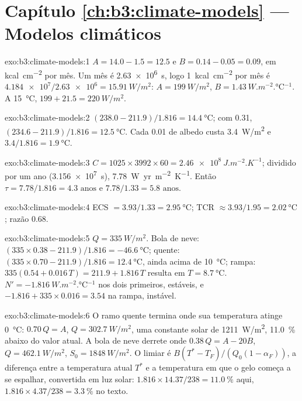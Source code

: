 \section*{Capítulo \ref{ch:b3:climate-models} --- Modelos climáticos}

\begin{solution}{exo:b3:climate-models:1}
$A = 14.0 - 1.5 = \num{12.5}$ e $B = 0.14 - 0.05 = \num{0.09}$, em
\unit{kcal.cm^{-2}} por mês. Um mês é \qty{2.63e6}{s}, logo
\qty{1}{kcal.cm^{-2}} por mês é $\num{4.184e7}/\num{2.63e6} =
\qty{15.91}{W/m^2}$: $A = \qty{199}{W/m^2}$, $B =
\qty{1.43}{W.m^{-2}.\celsius^{-1}}$. A \qty{15}{\celsius}, $199 + 21.5 =
\qty{220}{W/m^2}$.
\end{solution}

\begin{solution}{exo:b3:climate-models:2}
$(238.0 - 211.9)/1.816 = \qty{14.4}{\celsius}$; com 0.31, $(234.6 -
211.9)/1.816 = \qty{12.5}{\celsius}$. Cada 0.01 de albedo custa
\qty{3.4}{W/m^2} e $3.4/1.816 = \qty{1.9}{\celsius}$.
\end{solution}

\begin{solution}{exo:b3:climate-models:3}
$C = 1025\times3992\times60 = \qty{2.46e8}{J.m^{-2}.K^{-1}}$; dividido por
um ano (\qty{3.156e7}{s}), \qty{7.78}{W.yr.m^{-2}.K^{-1}}. Então $\tau
= 7.78/1.816 = \num{4.3}\text{ anos}$ e $7.78/1.33 = \num{5.8}\text{ anos}$.
\end{solution}

\begin{solution}{exo:b3:climate-models:4}
ECS $= 3.93/1.33 = \qty{2.95}{\celsius}$; TCR $\approx 3.93/1.95 =
\qty{2.02}{\celsius}$; razão \num{0.68}.
\end{solution}

\begin{solution}{exo:b3:climate-models:5}
$Q = \qty{335}{W/m^2}$. Bola de neve: $(335\times0.38 - 211.9)/1.816 =
\qty{-46.6}{\celsius}$; quente: $(335\times0.70 - 211.9)/1.816 =
\qty{12.4}{\celsius}$, ainda acima de \qty{10}{\celsius}; rampa: $335(0.54 +
0.016\,T) = 211.9 + 1.816\,T$ resulta em $T = \qty{8.7}{\celsius}$. $N' =
\qty{-1.816}{W.m^{-2}.\celsius^{-1}}$ nos dois primeiros, estáveis, e $-1.816
+ 335\times0.016 = \num{+3.54}$ na rampa, instável.
\end{solution}

\begin{solution}{exo:b3:climate-models:6}
O ramo quente termina onde sua temperatura atinge \qty{0}{\celsius}:
$0.70\,Q = A$, $Q = \qty{302.7}{W/m^2}$, uma constante solar de
\qty{1211}{W/m^2}, \qty{11.0}{\percent} abaixo do valor atual. A bola de neve derrete
onde $0.38\,Q = A - 20B$, $Q = \qty{462.1}{W/m^2}$, $S_0 =
\qty{1848}{W/m^2}$. O limiar é $B(T^* - T_F)/(Q_0(1 - \alpha_F))$,
a diferença entre a temperatura atual $T^*$ e a temperatura em que o
gelo começa a se espalhar, convertida em luz solar: $1.816\times14.37/238 =
\qty{11.0}{\percent}$ aqui, $1.816\times4.37/238 = \qty{3.3}{\percent}$ no
texto.
\end{solution}

